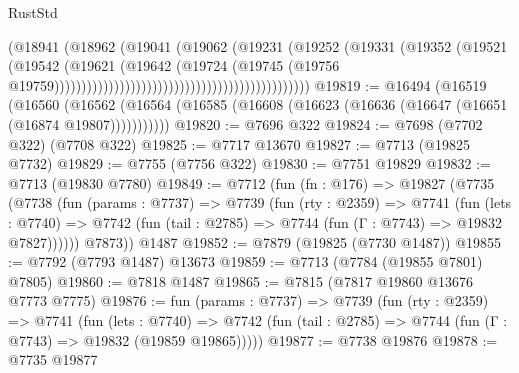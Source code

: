 \begin{lexlean}{RustStd}
\begin{coremodule}
                                                                    (@18941
                                                                      (@18962
                                                                        (@19041
                                                                          (@19062
                                                                            (@19231
                                                                              (@19252
                                                                                (@19331
                                                                                  (@19352
                                                                                    (@19521
                                                                                      (@19542
                                                                                        (@19621
                                                                                          (@19642
                                                                                            (@19724
                                                                                              (@19745
                                                                                                (@19756
                                                                                                  @19759)))))))))))))))))))))))))))))))))))))))))))))))
@19819 := @16494
    (@16519
      (@16560
        (@16562 (@16564 (@16585 (@16608 (@16623 (@16636 (@16647 (@16651 (@16874 @19807)))))))))))
@19820 := @7696 @322
@19824 := @7698 (@7702 @322) (@7708 @322)
@19825 := @7717 @13670
@19827 := @7713 (@19825 @7732)
@19829 := @7755 (@7756 @322)
@19830 := @7751 @19829
@19832 := @7713 (@19830 @7780)
@19849 := @7712
    (fun (fn : @176) =>
    @19827
      (@7735
        (@7738
          (fun (params : @7737) =>
          @7739
            (fun (rty : @2359) =>
            @7741
              (fun (lets : @7740) =>
              @7742 (fun (tail : @2785) => @7744 (fun (Γ : @7743) => @19832 @7827))))))
        @7873))
    @1487
@19852 := @7879 (@19825 (@7730 @1487))
@19855 := @7792 (@7793 @1487) @13673
@19859 := @7713 (@7784 (@19855 @7801) @7805)
@19860 := @7818 @1487
@19865 := @7815 (@7817 @19860 @13676 @7773 @7775)
@19876 := fun (params : @7737) =>
  @7739
    (fun (rty : @2359) =>
    @7741
      (fun (lets : @7740) =>
      @7742 (fun (tail : @2785) => @7744 (fun (Γ : @7743) => @19832 (@19859 @19865)))))
@19877 := @7738 @19876
@19878 := @7735 @19877

\end{coremodule}
\end{lexlean}
